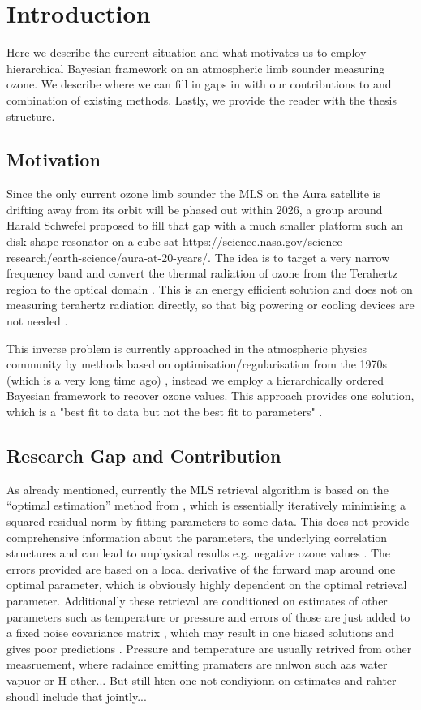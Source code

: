 \chapter{Introduction}
Here we describe the current situation and what motivates us to employ hierarchical Bayesian framework on an atmospheric limb sounder measuring ozone.
We describe where we can fill in gaps in with our contributions to and combination of existing methods.
Lastly, we provide the reader with the thesis structure.

\section{Motivation}
Since the only current ozone limb sounder the MLS on the Aura satellite is drifting away from its orbit will be phased out within 2026, a group around Harald Schwefel proposed to fill that gap with a much smaller platform such an disk shape resonator on a cube-sat  https://science.nasa.gov/science-research/earth-science/aura-at-20-years/. \cite{ustin2024current}
The idea is to target a very narrow frequency band and convert the thermal radiation of ozone from the Terahertz region to the optical domain \cite{}.
This is an energy efficient solution and does not on measuring terahertz radiation directly, so that big powering or cooling devices are not needed \cite{}.

This inverse problem is currently approached in the atmospheric physics community by methods based on optimisation/regularisation from the 1970s (which is a very long time ago) \cite{rodgers1976retrieval}, instead we employ a hierarchically ordered Bayesian framework to recover ozone values.
This approach provides one solution, which is a "best fit to data but not the best fit to parameters" \cite{tan2016LecNot}.

\section{Research Gap and Contribution}

As already mentioned, currently the MLS retrieval algorithm \cite{livesey2006retrieval} is based on the “optimal estimation” method from \cite{rodgers1976retrieval}, which is essentially iteratively minimising a squared residual norm by fitting parameters to some data.
This does not provide comprehensive information about the parameters, the underlying correlation structures and can lead to unphysical results e.g. negative ozone values \cite{MLSdata}.
The errors provided are based on a local derivative of the forward map around one optimal parameter, which is obviously highly dependent on the optimal retrieval parameter.
Additionally these retrieval are conditioned on estimates of other parameters such as temperature or pressure and errors of those are just added to a fixed noise covariance matrix \cite[Eq. 6]{livesey2006retrieval}, which may result in one biased solutions and gives poor predictions \cite{}.
Pressure and temperature are usually retrived from other measruement, where radaince emitting pramaters are nnlwon such aas water vapuor or H other...
But still hten one not condiyionn on estimates and rahter shoudl include that jointly...


